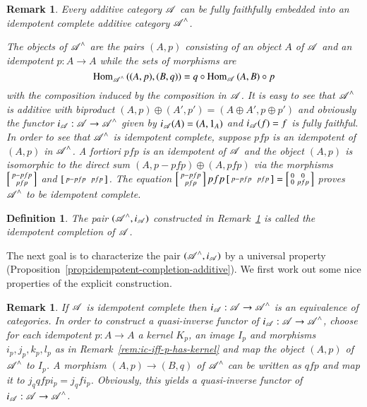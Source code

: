 \documentclass[1p]{elsarticle}
\theoremstyle{mythm}
\theoremstyle{mydef}
\newtheorem{Rem}[Thm]{Remark}
\newtheorem{Def}[Thm]{Definition}
\begin{document}
\begin{Rem}
  \label{rem:constr-idemp-compl}
  Every additive category $\operatorname{\mathscr{A}}$ can be fully faithfully
  embedded into an idempotent complete
  additive category $\operatorname{\mathscr{A}}^{\wedge}$.
  
  The objects of $\operatorname{\mathscr{A}}^{\wedge}$ are the pairs
  $(A, p)$ consisting of an object $A$ of $\operatorname{\mathscr{A}}$ and an
  idempotent $p: A \to A$ while the sets of morphisms are 
  \[
  \operatorname{Hom}_{\operatorname{\mathscr{A}}^{\wedge}}{((A,p), (B,q))} = q \circ \operatorname{Hom}_{\operatorname{\mathscr{A}}} {(A, B)}
  \circ p
  \]
  with the composition induced by the composition in $\operatorname{\mathscr{A}}$.
  It is easy to see that $\operatorname{\mathscr{A}}^{\wedge}$ is additive with biproduct
  $(A, p) \oplus (A',p') = (A \oplus A', p \oplus p')$ and obviously the
  functor $i_{\operatorname{\mathscr{A}}}:\operatorname{\mathscr{A}} \to \operatorname{\mathscr{A}}^{\wedge}$ given by
  $i_{\operatorname{\mathscr{A}}}{(A)} = (A,1_{A})$ and $i_{\operatorname{\mathscr{A}}}(f) = f$ is fully faithful. 
  In order to see that $\operatorname{\mathscr{A}}^{\wedge}$ is idempotent 
  complete, suppose $pfp$ is an idempotent of $(A,p)$ in
  $\operatorname{\mathscr{A}}^{\wedge}$. \emph{A fortiori} $pfp$ is an idempotent of $\operatorname{\mathscr{A}}$
  and the object $(A,p)$ is isomorphic to the direct sum
  $(A,p - pfp) \oplus (A,pfp)$
  via the morphisms $\left[\begin{smallmatrix} p - pfp \\ pfp \end{smallmatrix}\right]$ and $\left[\begin{smallmatrix} p-pfp & & pfp \end{smallmatrix}\right]$. 
  The equation $\left[\begin{smallmatrix} p - pfp \\ pfp \end{smallmatrix}\right] pfp \left[\begin{smallmatrix} p - pfp & & pfp \end{smallmatrix}\right] = 
  \left[\begin{smallmatrix} 0 & 0 \\ 0 & pfp \end{smallmatrix}\right]$ proves $\operatorname{\mathscr{A}}^{\wedge}$ to be
  idempotent complete.
\end{Rem}

\begin{Def}
  The pair $(\operatorname{\mathscr{A}}^{\wedge}, i_{\operatorname{\mathscr{A}}})$ constructed in
  Remark~\ref{rem:constr-idemp-compl}  
  is called the \emph{idempotent completion} of $\operatorname{\mathscr{A}}$.
\end{Def}

The next goal is to characterize the pair
$(\operatorname{\mathscr{A}}^{\wedge}, i_{\operatorname{\mathscr{A}}})$ by a universal property
(Proposition~\ref{prop:idempotent-completion-additive}).
We first work out some nice properties of the explicit
construction. 


\begin{Rem}
  \label{rem:ic-of-ic-cat-is-ic}
  If $\operatorname{\mathscr{A}}$ is idempotent
  complete then $i_{\operatorname{\mathscr{A}}}: \operatorname{\mathscr{A}} \to \operatorname{\mathscr{A}}^{\wedge}$ is an
  equivalence of categories. In order to construct a quasi-inverse
  functor of $i_{\operatorname{\mathscr{A}}}: \operatorname{\mathscr{A}} \to \operatorname{\mathscr{A}}^{\wedge}$, choose for each
  idempotent $p: A \to A$ a kernel $K_{p}$, an image $I_{p}$ and
  morphisms $i_{p}, j_{p}, k_{p}, l_{p}$ as in 
  Remark~\ref{rem:ic-iff-p-has-kernel} and map the
  object $(A,p)$ of $\operatorname{\mathscr{A}}^{\wedge}$ to $I_{p}$. 
  A morphism $(A,p) \to (B,q)$ of $\operatorname{\mathscr{A}}^{\wedge}$ can be written
  as $qfp$ and map it to $j_{q}qfpi_{p} = j_{q}fi_{p}$. Obviously,
  this yields a quasi-inverse functor of 
  $i_{\operatorname{\mathscr{A}}}: \operatorname{\mathscr{A}} \to \operatorname{\mathscr{A}}^{\wedge}$.
\end{Rem}
\end{document}
